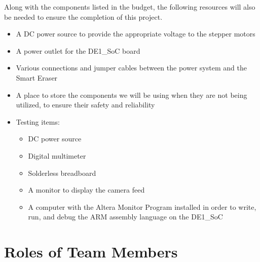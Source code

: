 Along with the components listed in the budget, the following resources will also be needed to ensure the completion of this project.

\begin{itemize}
	\item A DC power source to provide the appropriate voltage to the stepper motors
	\item A power outlet for the DE1\_SoC board
	\item Various connections and jumper cables between the power system and the Smart Eraser
	\item A place to store the components we will be using when they are not being utilized, to ensure their safety and reliability
	\item Testing items:
	\begin{itemize}
		\item DC power source
		\item Digital multimeter
		\item Solderless breadboard
		\item A monitor to display the camera feed
		\item A computer with the Altera Monitor Program installed in order to write, run, and debug the ARM assembly language on the DE1\_SoC
	\end{itemize}
\end{itemize}

\section{Roles of Team Members}
